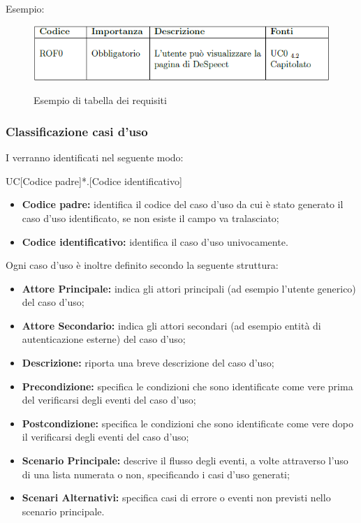 \documentclass[../NomeDocumento.tex]{subfiles}
\begin{document}
	
	Esempio:
	\begin{figure}[h]
		\centering
		\includegraphics[width=0.7\linewidth]{img/esempio_tabella_requisiti}
		\label{fig:esempio di tabella dei requisiti}
		\caption{Esempio di tabella dei requisiti}
	\end{figure}
		
		
	\subsubsection{Classificazione casi d’uso} 
	
I  verranno identificati nel seguente modo: 

\begin{center}
	UC[Codice padre]*.[Codice identificativo]
\end{center}

\begin{itemize}
	\item \textbf{Codice padre:} identifica il codice del caso d'uso da cui è stato generato il caso d'uso identificato, se non esiste il campo va tralasciato;
	\item \textbf{Codice identificativo:} identifica il caso d'uso univocamente.
\end{itemize}

	\noindent Ogni caso d'uso è inoltre definito secondo la seguente struttura:
\begin{itemize}
	\item \textbf{Attore Principale:} indica gli attori principali (ad esempio l'utente generico) del caso d'uso;
	\item \textbf{Attore Secondario:} indica gli attori secondari (ad esempio entità di autenticazione esterne) del caso d'uso;
	\item \textbf{Descrizione:} riporta una breve descrizione del caso d'uso;
	\item \textbf{Precondizione:} specifica le condizioni che sono identificate come vere prima del verificarsi degli eventi del caso d'uso;
	\item \textbf{Postcondizione:} specifica le condizioni che sono identificate come vere dopo il verificarsi degli eventi del caso d'uso;
	\item \textbf{Scenario Principale:} descrive il flusso degli eventi, a volte attraverso l'uso di una lista numerata o non, specificando i casi d'uso generati;
	\item \textbf{Scenari Alternativi:} specifica casi di errore o eventi non previsti nello scenario principale.
\end{itemize}
\end{document}
